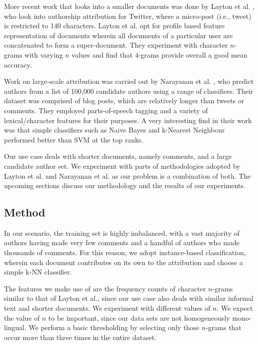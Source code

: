 More recent work that looks into a smaller documents was done by Layton et al. \cite{layton_authorship_2010}, who look into authorship attribution for Twitter, where a micro-post (i.e., tweet) is restricted to 140 characters. Layton et al. opt for profile based feature representation of documents wherein all documents of a particular user are concatenated to form a super-document. They experiment with character $n$-grams with varying $n$ values and find that $4$-grams provide overall a good mean accuracy.

Work on large-scale attribution was carried out by Narayanan et al. \cite{narayanan_feasibility_2012}, who predict authors from a list of 100,000 candidate authors using a range of classifiers. Their dataset was comprised of blog posts, which are relatively longer than tweets or comments. They employed parts-of-speech tagging and a variety of lexical/character features for their purposes. A very interesting find in their work was that simple classifiers such as Naive Bayes and k-Nearest Neighbour performed better than SVM at the top ranks. 

Our use case deals with shorter documents, namely comments, and a large candidate author set. We experiment with parts of methodologies adopted by Layton et al. \cite{layton_authorship_2010} and Narayanan et al. \cite{narayanan_feasibility_2012} as our problem is a combination of both. The upcoming sections discuss our methodology and the results of our experiments.

\subsection{Method}
In our scenario, the training set is highly imbalanced, with a vast majority of authors having made very few comments and a handful of authors who made thousands of comments. For this reason, we adopt instance-based classification, wherein each document contributes on its own to the attribution and choose a simple k-NN classifier.

The features we make use of are the frequency counts of character $n$-grams similar to that of Layton et al., since our use case also deals with similar informal text and shorter documents. We experiment with different values of $n$. We expect the value of $n$ to be important, since our data sets are not homogeneously mono-lingual. We perform a basic thresholding by selecting only those $n$-grams that occur more than three times in the entire dataset.

